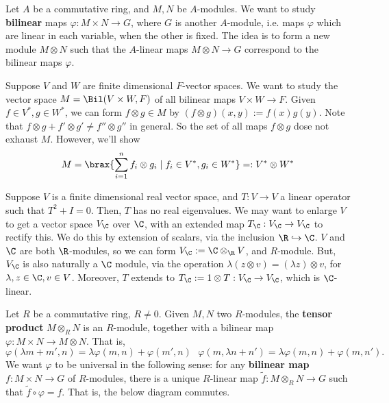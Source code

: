Let $A$ be a commutative ring, and $M,N$ be $A$-modules. We want to study \textbf{bilinear} maps $\varphi: M \times N \to G$, where $G$ is another $A$-module, i.e. maps $\varphi$ which are linear in each variable, when the other is fixed. The idea is to form a new module $M \otimes N$ such that the $A$-linear maps $M \otimes N \to G$ correspond to the bilinear maps $\varphi$.

\begin{ex}
    Suppose $V$ and $W$ are finite dimensional $F$-vector spaces. We want to study the vector space $M=\Bil (V\times W, F)$ of all bilinear maps $V \times W \to F$. Given $f \in V^*, g \in W^*$, we can form $f \otimes g \in M$ by $(f \otimes g)(x,y) := f(x)g(y)$. Note that $f \otimes g + f'\otimes g' \neq f'' \otimes g''$ in general. So the set of all maps $f \otimes g$ dose not exhaust $M$. However, we'll show
    $$M = \brax{\sum_{i=1}^n f_i \otimes g_i \mid f_i \in V^*,g_i \in W^*}=: V^* \otimes W^*$$
\end{ex}

\begin{ex}
    Suppose $V$ is a finite dimensional real vector space, and $T:V \to V$ a linear operator such that $T^2+I=0$. Then, $T$ has no real eigenvalues. We may want to enlarge $V$ to get a vector space $V_\C$ over $\C$, with an extended map $T_\C :V_\C \to V_\C$ to rectify this. We do this by extension of scalars, via the inclusion $\R \hookrightarrow \C$. $V$ and $\C$ are both $\R$-modules, so we can form $V_\C := \C \otimes_\R V$, and $R$-module. But, $V_\C$ is also naturally a $\C$ module, via the operation $\lambda(z \otimes v)=(\lambda z) \otimes v$, for $\lambda,z \in \C,v \in V$. Moreover, $T$ extends to $T_\C := 1 \otimes T: V_\C \to V_\C$, which is $\C$-linear.
\end{ex}

Let $R$ be a commutative ring, $R \neq 0$. Given $M,N$ two $R$-modules, the \textbf{tensor product} $M \otimes _RN$ is an $R$-module, together with a bilinear map $\varphi :M \times N \to M\otimes N$. That is,
$$\varphi (\lambda m + m', n) = \lambda \varphi (m,n) + \varphi(m',n)\:\:\: \varphi(m, \lambda n+n')=\lambda\varphi (m,n) + \varphi(m,n').$$
We want $\varphi$ to be universal in the following sense: for any \textbf{bilinear map} $f :M \times N \to G$ of $R$-modules, there is a unique $R$-linear map $\tilde f: M \otimes_R N \to G$ such that $\tilde f \circ \varphi = f$. That is, the below diagram commutes.


